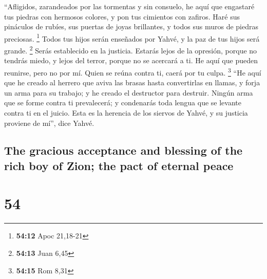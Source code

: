 \begin{paracol}{2}
 ``Afligidos, zarandeados por las tormentas y sin
consuelo, he aquí que engastaré tus piedras con hermosos colores, y pon
tus cimientos con zafiros.  Haré sus pináculos de rubíes,
sus puertas de joyas brillantes, y todos sus muros de piedras preciosas.
\footnote{\textbf{54:12} Apoc 21,18-21}  Todos tus hijos
serán enseñados por Yahvé, y la paz de tus hijos será grande.
\footnote{\textbf{54:13} Juan 6,45}  Serás establecido en
la justicia. Estarás lejos de la opresión, porque no tendrás miedo, y
lejos del terror, porque no se acercará a ti.  He aquí
que pueden reunirse, pero no por mí. Quien se reúna contra ti, caerá por
tu culpa. \footnote{\textbf{54:15} Rom 8,31}  ``He aquí
que he creado al herrero que aviva las brasas hasta convertirlas en
llamas, y forja un arma para su trabajo; y he creado el destructor para
destruir.  Ningún arma que se forme contra ti
prevalecerá; y condenarás toda lengua que se levante contra ti en el
juicio. Esta es la herencia de los siervos de Yahvé, y su justicia
proviene de mí'', dice Yahvé.

\switchcolumn
\begin{otherlanguage}{english}

\hypertarget{the-gracious-acceptance-and-blessing-of-the-rich-boy-of-zion-the-pact-of-eternal-peace}{%
\subsection{The gracious acceptance and blessing of the rich boy of
Zion; the pact of eternal
peace}\label{the-gracious-acceptance-and-blessing-of-the-rich-boy-of-zion-the-pact-of-eternal-peace}}

\hypertarget{section-107}{%
\section{54}\label{section-107}}


\end{otherlanguage}
\end{paracol}
